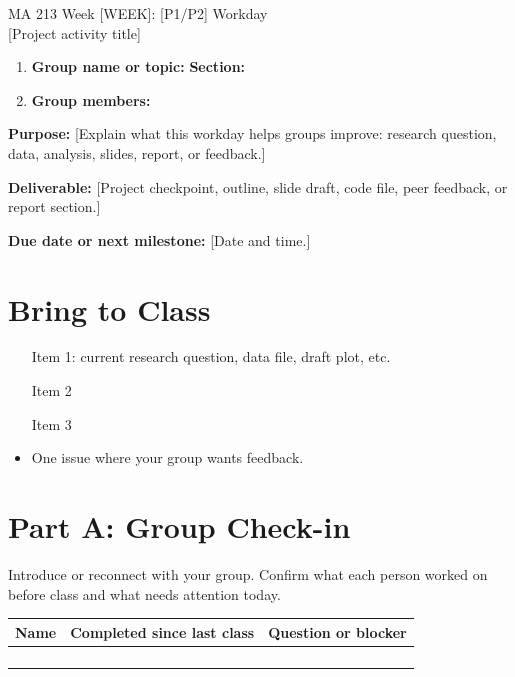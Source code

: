\documentclass[11pt]{article}
\begin{document}
\begin{center}
  {\LARGE MA 213 Week [WEEK]: [P1/P2] Workday}\\[3pt]
  {\large [Project activity title]}
\end{center}

\begin{enumerate}
  \item \textbf{Group name or topic:} \underline{\hspace{0.45\textwidth}} \hfill \textbf{Section:} \underline{\hspace{0.18\textwidth}}
  \item \textbf{Group members:} \underline{\hspace{0.72\textwidth}}
\end{enumerate}

\textbf{Purpose:} [Explain what this workday helps groups improve: research question, data, analysis, slides, report, or feedback.]

\textbf{Deliverable:} [Project checkpoint, outline, slide draft, code file, peer feedback, or report section.]

\textbf{Due date or next milestone:} [Date and time.]

\section*{Bring to Class}

\begin{itemize}
  \item [Item 1: current research question, data file, draft plot, etc.]
  \item [Item 2]
  \item [Item 3]
  \item One issue where your group wants feedback.
\end{itemize}

\section*{Part A: Group Check-in}

Introduce or reconnect with your group. Confirm what each person worked on before class and what needs attention today.

\begin{center}
\begin{tabular}{|p{}|p{}|p{}|}
\hline
\textbf{Name} & \textbf{Completed since last class} & \textbf{Question or blocker}\\
\hline
 & & \\[22pt]
\hline
 & & \\[22pt]
\hline
 & & \\[22pt]
\hline
 & & \\[22pt]
\hline
\end{tabular}
\end{center}
\end{document}
